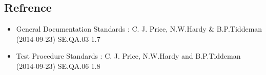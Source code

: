 \subsection{Refrence}
	\begin{itemize}
		\item General Documentation Standards : C. J. Price, N.W.Hardy & B.P.Tiddeman (2014-09-23) SE.QA.03 1.7
		\item Test Procedure Standards : C. J. Price, N.W.Hardy and B.P.Tiddeman (2014-09-23) SE.QA.06 1.8
		
	\end{itemize}
